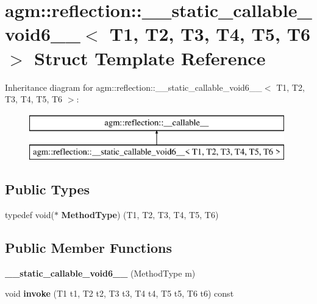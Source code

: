 \hypertarget{structagm_1_1reflection_1_1____static__callable__void6____}{}\section{agm\+:\+:reflection\+:\+:\+\_\+\+\_\+static\+\_\+callable\+\_\+void6\+\_\+\+\_\+$<$ T1, T2, T3, T4, T5, T6 $>$ Struct Template Reference}
\label{structagm_1_1reflection_1_1____static__callable__void6____}
Inheritance diagram for agm\+:\+:reflection\+:\+:\+\_\+\+\_\+static\+\_\+callable\+\_\+void6\+\_\+\+\_\+$<$ T1, T2, T3, T4, T5, T6 $>$\+:\begin{figure}[H]
\begin{center}
\leavevmode
\includegraphics[height=2.000000cm]{structagm_1_1reflection_1_1____static__callable__void6____}
\end{center}
\end{figure}
\subsection*{Public Types}
\begin{DoxyCompactItemize}
\item 
typedef void($\ast$ {\bfseries Method\+Type}) (T1, T2, T3, T4, T5, T6)\hypertarget{structagm_1_1reflection_1_1____static__callable__void6_____a08b21a3c2330201fa9a1b0c17b640701}{}\label{structagm_1_1reflection_1_1____static__callable__void6_____a08b21a3c2330201fa9a1b0c17b640701}

\end{DoxyCompactItemize}
\subsection*{Public Member Functions}
\begin{DoxyCompactItemize}
\item 
{\bfseries \+\_\+\+\_\+static\+\_\+callable\+\_\+void6\+\_\+\+\_\+} (Method\+Type m)\hypertarget{structagm_1_1reflection_1_1____static__callable__void6_____af00e27cb5f27e0a1a2112117b2fb7b92}{}\label{structagm_1_1reflection_1_1____static__callable__void6_____af00e27cb5f27e0a1a2112117b2fb7b92}

\item 
void {\bfseries invoke} (T1 t1, T2 t2, T3 t3, T4 t4, T5 t5, T6 t6) const \hypertarget{structagm_1_1reflection_1_1____static__callable__void6_____a70797bfe6dc565fb426ce494621735c2}{}\label{structagm_1_1reflection_1_1____static__callable__void6_____a70797bfe6dc565fb426ce494621735c2}

\end{DoxyCompactItemize}
